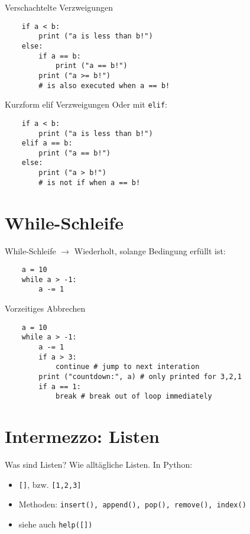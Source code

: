 \begin{frame}[fragile]{Verschachtelte Verzweigungen}
    \begin{lstlisting}
    if a < b:
        print ("a is less than b!")
    else:
        if a == b:
            print ("a == b!")
        print ("a >= b!")
        # is also executed when a == b! 
    \end{lstlisting}
\end{frame}

\begin{frame}[fragile]{Kurzform elif Verzweigungen}
    Oder mit \texttt{elif}:
    \begin{lstlisting}
    if a < b:
        print ("a is less than b!")
    elif a == b:
        print ("a == b!")
    else:
        print ("a > b!")
        # is not if when a == b! 
    \end{lstlisting}
\end{frame}

\section{While-Schleife}

\begin{frame}[fragile]{While-Schleife}
    $\rightarrow$ Wiederholt, solange Bedingung erfüllt ist:
    \begin{lstlisting}
    a = 10
    while a > -1:
        a -= 1
    \end{lstlisting}
\end{frame}

\begin{frame}[fragile]{Vorzeitiges Abbrechen} 
    \begin{lstlisting}
    a = 10
    while a > -1:
        a -= 1
        if a > 3:
            continue # jump to next interation
        print ("countdown:", a) # only printed for 3,2,1
        if a == 1:
            break # break out of loop immediately
    \end{lstlisting}
\end{frame}

\section{Intermezzo: Listen}

\begin{frame}{Was sind Listen?}
    Wie alltägliche Listen. In Python:
    \begin{itemize}
        \item \texttt{[]}, bzw. \texttt{[1,2,3]}
        \item Methoden: \texttt{insert(), append(), pop(), remove(), index()}
        \item siehe auch \texttt{help([])}
    \end{itemize}
\end{frame}

